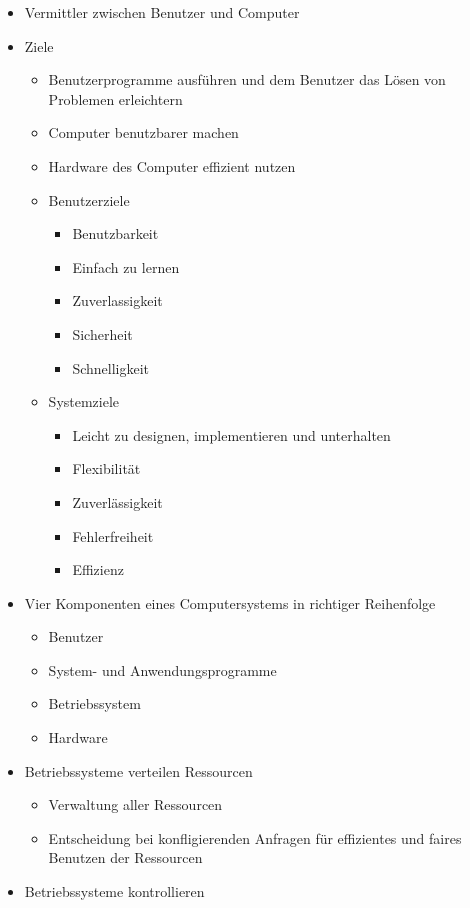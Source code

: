 \documentclass[a4paper]{scrreprt}
\begin{document}
\begin{itemize}
	\item Vermittler zwischen Benutzer und Computer
	\item Ziele
		\begin{itemize}
			\item Benutzerprogramme ausführen und dem Benutzer das Lösen von Problemen erleichtern
			\item Computer benutzbarer machen
			\item Hardware des Computer effizient nutzen
			\item Benutzerziele
				\begin{itemize}
					\item Benutzbarkeit
					\item Einfach zu lernen
					\item Zuverlassigkeit
					\item Sicherheit
					\item Schnelligkeit
				\end{itemize}
			\item Systemziele
				\begin{itemize}
					\item Leicht zu designen, implementieren und unterhalten
					\item Flexibilität
					\item Zuverlässigkeit
					\item Fehlerfreiheit
					\item Effizienz
				\end{itemize}
		\end{itemize}
	\item Vier Komponenten eines Computersystems in richtiger Reihenfolge
		\begin{itemize}
			\item Benutzer
			\item System- und Anwendungsprogramme
			\item Betriebssystem
			\item Hardware
		\end{itemize}
	\item Betriebssysteme verteilen Ressourcen
		\begin{itemize}
			\item Verwaltung aller Ressourcen
			\item Entscheidung bei konfligierenden Anfragen für effizientes und faires Benutzen der Ressourcen
		\end{itemize}
	\item Betriebssysteme kontrollieren

\end{itemize}
\end{document}
